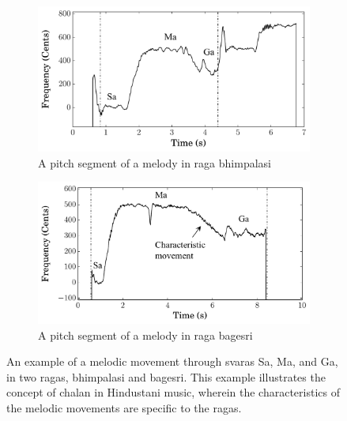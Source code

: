 \begin{figure}[h]

	\begin{subfigure}{\textwidth}
		\centering		
		\includegraphics[width=\figSizeSeventyFive]{ch02_background/figures/Bhimpalasi_S-m-g_Stereo.pdf}
		\caption{A pitch segment of a melody in \gls{raga} \gls{bhimpalasi}}
		\label{fig:chalan_bhimpalasi}
	\end{subfigure}
	\begin{subfigure}{\textwidth}
		\centering
		\includegraphics[width=\figSizeSeventyFive]{ch02_background/figures/Bageshri_S-m-g_Stereo.pdf}
		\caption{A pitch segment of a melody in \gls{raga} \gls{bagesri}}
		\label{fig:chalan_bageshri}
	\end{subfigure}
	\caption[An example of \gls{chalan} in Hindustani music]{An example of a melodic movement through \glspl{svara} Sa, Ma, and Ga, in two \glspl{raga}, \gls{bhimpalasi} and \gls{bagesri}. This example illustrates the concept of \gls{chalan} in Hindustani music, wherein the characteristics of the melodic movements are specific to the \glspl{raga}.}
	\label{fig:chalan_example}
\end{figure}

